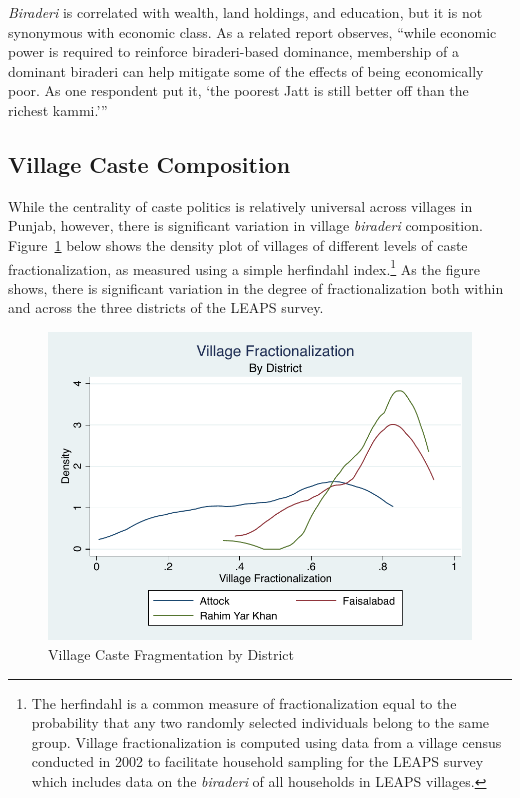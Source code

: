 \documentclass[Eubank_pk_ethnic_sorting.tex]{subfiles}
\begin{document}
\emph{Biraderi} is correlated with wealth, land holdings, and education, but it is not synonymous with economic class. As a related report observes, ``while economic power is required to reinforce biraderi-based dominance, membership of a dominant biraderi can help mitigate some of the effects of being economically poor. As one respondent put it, `the poorest Jatt is still better off than the richest kammi.''' \citep[p. 13]{Gazdar:2007vt}

\subsection{Village Caste Composition}\label{context_village_composition}

While the centrality of caste politics is relatively universal across villages in Punjab, however, there is significant variation in village \emph{biraderi} composition. Figure~\ref{fracdensities} below shows the density plot of villages of different levels of caste fractionalization, as measured using a simple herfindahl index.\footnote{The herfindahl is a common measure of fractionalization equal to the probability that any two randomly selected individuals belong to the same group. Village fractionalization is computed using data from a village census conducted in 2002 to facilitate household sampling for the LEAPS survey which includes data on the \emph{biraderi} of all households in LEAPS villages.} As the figure shows, there is significant variation in the degree of fractionalization both within and across the three districts of the LEAPS survey.

\begin{figure}[htb]
	\begin{center}
	\caption{Village Caste Fragmentation by District}\label{fracdensities}
	\includegraphics[scale=1.0]{../results/village_frac_by_district.pdf}
	\end{center}
\end{figure}
\end{document}

